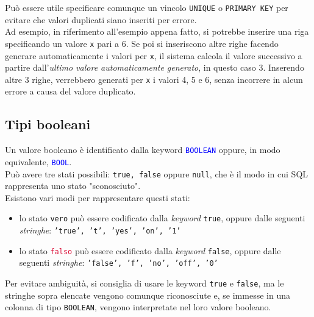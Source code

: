 \documentclass[12pt,a4paper]{book}
\begin{document}
	Può essere utile specificare comunque un vincolo \texttt{UNIQUE} o \texttt{PRIMARY KEY} per evitare che valori duplicati siano inseriti per errore. \\Ad esempio, in riferimento all'esempio appena fatto, si potrebbe inserire una riga specificando un valore \texttt{x} pari a 6. Se poi si inseriscono altre righe facendo generare automaticamente i valori per \texttt{x}, il sistema calcola il valore successivo a partire dall'\textit{ultimo valore automaticamente generato}, in questo caso 3. Inserendo altre 3 righe, verrebbero generati per \texttt{x} i valori 4, 5 e 6, senza incorrere in alcun errore a causa del valore duplicato.
	\subsection{Tipi booleani}
	Un valore booleano è identificato dalla keyword \textcolor{blue}{\texttt{BOOLEAN}} oppure, in modo equivalente, \textcolor{blue}{\texttt{BOOL}}.\\ Può avere tre stati possibili: \texttt{true, false} oppure \texttt{null}, che è il modo in cui SQL rappresenta uno stato "sconosciuto".\\
	Esistono vari modi per rappresentare questi stati:
	\begin{itemize}
		\item lo stato \textcolor{dkgreen}{\texttt{vero}} può essere codificato dalla \textit{keyword} \texttt{true}, oppure dalle seguenti \textit{stringhe}: \texttt{'true', 't', 'yes', 'on', '1'}
		\item lo stato \textcolor{crimson}{\texttt{falso}} può essere codificato dalla \textit{keyword} \texttt{false}, oppure dalle seguenti \textit{stringhe}: \texttt{'false', 'f', 'no', 'off', '0'}
	\end{itemize}
	Per evitare ambiguità, si consiglia di usare le keyword \texttt{true} e \texttt{false}, ma le stringhe sopra elencate vengono comunque riconosciute e, se immesse in una colonna di tipo \texttt{BOOLEAN}, vengono interpretate nel loro valore booleano.
\end{document}
